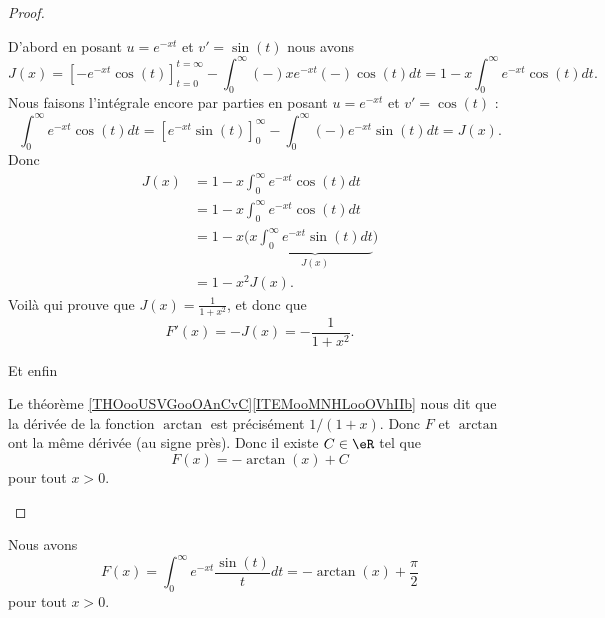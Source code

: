 \begin{proof}
\begin{subproof}
		D'abord en posant \( u= e^{-xt}\) et \( v'=\sin(t)\) nous avons
		\begin{equation}
			J(x)=\left[ - e^{-xt}\cos(t) \right]_{t=0}^{t=\infty}-\int_0^{\infty}(-)x e^{-xt}(-)\cos(t)dt=1-x\int_0^{\infty} e^{-xt}\cos(t)dt.
		\end{equation}
		Nous faisons l'intégrale encore par parties en posant \( u= e^{-xt}\) et \( v'=\cos(t)\) :
		\begin{equation}
			\int_0^{\infty} e^{-xt}\cos(t)dt=\left[  e^{-xt}\sin(t) \right]_0^{\infty}-\int_0^{\infty}(-) e^{-xt}\sin(t)dt=J(x).
		\end{equation}
		Donc
		\begin{subequations}
			\begin{align}
				J(x) & =1-x\int_0^{\infty} e^{-xt}\cos(t)dt                                  \\
				     & =1-x\int_0^{\infty} e^{-xt}\cos(t)dt                                  \\
				     & =1-x\Big( x\underbrace{\int_0^{\infty} e^{-xt}\sin(t)dt}_{J(x)} \Big) \\
				     & =1-x^2J(x).
			\end{align}
		\end{subequations}
		Voilà qui prouve que \( J(x)=\frac{1}{ 1+x^2 }\), et donc que
		\begin{equation}
			F'(x)=-J(x)=-\frac{1}{ 1+x^2 }.
		\end{equation}

		\item[Et enfin]

		Le théorème \ref{THOooUSVGooOAnCvC}\ref{ITEMooMNHLooOVhIIb} nous dit que la dérivée de la fonction \( \arctan\) est précisément \( 1/(1+x)\). Donc \( F\) et \( \arctan\) ont la même dérivée (au signe près). Donc il existe \( C\in \eR\) tel que
		\begin{equation}
			F(x)=-\arctan(x)+C
		\end{equation}
		pour tout \( x>0\).

	\end{subproof}
\end{proof}

\begin{lemma}       \label{LEMooEOYHooVIMCCa}
	Nous avons
	\begin{equation}
		F(x)=\int_0^{\infty} e^{-xt}\frac{ \sin(t) }{ t }dt=-\arctan(x)+\frac{ \pi }{2}
	\end{equation}
	pour tout \( x>0\).
\end{lemma}

